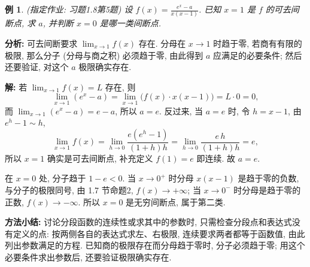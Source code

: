 \documentclass[UTF8,openany]{ctexbook}
\theoremstyle{chinesetextbook}
\newtheorem{example}{例}[section]
\newenvironment{cnsolution}{\par\indent\textbf{解:} \ignorespaces}{\par}
\begin{document}
\begin{example}
\textnormal{(指定作业: 习题1.8第5题)} 设 $\displaystyle f(x)=\frac{e^x-a}{x(x-1)}$. 已知 $x=1$ 是 $f$ 的可去间断点, 求 $a$, 并判断 $x=0$ 是哪一类间断点.
\end{example}
\par\indent\textbf{分析:} 可去间断要求 $\displaystyle\lim_{x\to1}f(x)$ 存在. 分母在 $x\to1$ 时趋于零, 若商有有限的极限, 那么分子 (分母与商之积) 必须趋于零, 由此得到 $a$ 应满足的必要条件; 然后还要验证, 对这个 $a$ 极限确实存在.
\begin{cnsolution}
若 $\displaystyle\lim_{x\to1}f(x)=L$ 存在, 则
\[
\lim_{x\to1}(e^x-a)=\lim_{x\to1}\bigl(f(x)\cdot x(x-1)\bigr)=L\cdot0=0,
\]
而 $\displaystyle\lim_{x\to1}(e^x-a)=e-a$, 所以 $a=e$. 反过来, 当 $a=e$ 时, 令 $h=x-1$, 由 $e^h-1\sim h$,
\[
\lim_{x\to1}f(x)=\lim_{h\to0}\frac{e(e^h-1)}{(1+h)h}=\lim_{h\to0}\frac{e\,h}{(1+h)h}=e,
\]
所以 $x=1$ 确实是可去间断点, 补充定义 $f(1)=e$ 即连续. 故 $a=e$.

在 $x=0$ 处, 分子趋于 $1-e<0$. 当 $x\to0^+$ 时分母 $x(x-1)$ 是趋于零的负数, 与分子的极限同号, 由 1.7 节命题2, $f(x)\to+\infty$; 当 $x\to0^-$ 时分母是趋于零的正数, $f(x)\to-\infty$. 所以 $x=0$ 是无穷间断点, 属于第二类.
\end{cnsolution}
\par\indent\textbf{方法小结:} 讨论分段函数的连续性或求其中的参数时, 只需检查分段点和表达式没有定义的点: 按两侧各自的表达式求左、右极限, 连续要求两者都等于函数值, 由此列出参数满足的方程. 已知商的极限存在而分母趋于零时, 分子必须趋于零; 用这个必要条件求出参数后, 还要验证极限确实存在.
\end{document}
